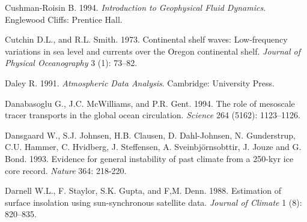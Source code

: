 \begin{thebibliography}{999}
Cushman-Roisin B.  1994. \textit{Introduction to Geophysical Fluid
  Dynamics}.  Englewood Cliffs: Prentice Hall.
%

Cutchin D.L., and R.L. Smith.  1973. Continental shelf waves:
Low-frequency variations in sea level and currents over the Oregon
continental shelf. \textit{Journal of Physical Oceanography} 3 (1):
73--82.
%

Daley R.  1991. \textit{Atmospheric Data Analysis}.  Cambridge:
University Press.
%

Danabasoglu G., J.C. McWilliams, and P.R. Gent.  1994. The role of
mesoscale tracer transports in the global ocean
circulation. \textit{Science} 264 (5162): 1123--1126.
%

Dansgaard W., S.J. Johnsen, H.B. Clausen, D. Dahl-Johnsen, N.
Gunderstrup, C.U. Hammer, C. Hvidberg, J. Steffensen,
A. Sveinbj\"{o}rnsobttir, J.  Jouze and G. Bond. 1993. Evidence for
general instability of past climate from a 250-kyr ice core
record. \textit{Nature} 364: 218-220.
%

Darnell W.L., F. Staylor, S.K. Gupta, and F,M. Denn. 1988. Estimation
of surface insolation using sun-synchronous satellite
data. \textit{Journal of Climate} 1 (8): 820--835.
%


\end{thebibliography}
